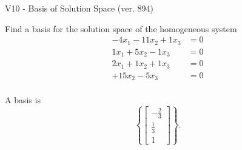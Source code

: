 \begin{exercise}
  \begin{exerciseTitle}V10 - Basis of Solution Space (ver. 894)\end{exerciseTitle}
  \begin{exerciseStatement}
    Find a basis for the solution space of the homogeneous system 
\begin{align*}
 -4 x_ 1 -11 x_ 2 + 1 x_ 3 &= 0  \\ 
  1 x_ 1 + 5 x_ 2 -1 x_ 3 &= 0  \\ 
  2 x_ 1 + 1 x_ 2 + 1 x_ 3 &= 0  \\ 
  + 15 x_ 2 -5 x_ 3 &= 0  \\ 
 \end{align*}


 
  \end{exerciseStatement}

  \begin{exerciseAnswer}
   A basis is   
\[\left\{\left[\begin{array}{c}
-\frac{2}{3} \\
\frac{1}{3} \\
1
\end{array}\right]\right\}.\]

  


  \end{exerciseAnswer}
\end{exercise}
